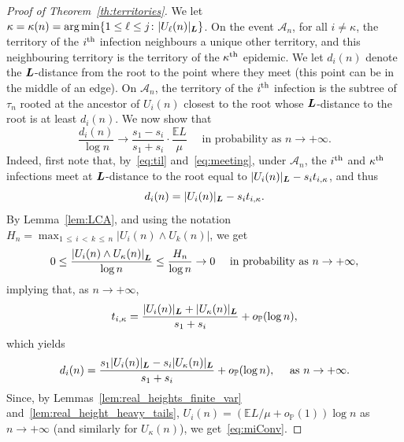 \documentclass[AHL,Unicode,longabstracts,published]{cedram}
\DeclareMathOperator*{\argmin}{arg\,min}
\newcommand{\bs}{\ensuremath{\boldsymbol}}
\newcommand{\op}{{o_{\bbP}}}
\newcommand{\bbP}{\mathbb{P}}
\newcommand{\bbE}{\mathbb{E}}
\newcommand{\clA}{\mathcal{A}}
\begin{document}
\begin{proof}[Proof of Theorem~\ref{th:territories}]
We let $\kappa = \kappa(n) = \argmin \{1\leq \ell\leq j\colon |U_\ell(n)|_{\bs L}\}$. On the event $\clA_n$, for all $i\neq \kappa$, the territory of the $i^{\rm th}$ infection neighbours a unique other territory, and this neighbouring territory is the territory of the $\kappa^{\rm th}$ epidemic. We let $d_i(n)$ denote the $\bs L$-distance from the root to the point where they meet (this point can be in the middle of an edge). On $\clA_n$, the territory of the $i^{\rm th}$ infection is the subtree of $\tau_n$ rooted at the ancestor of $U_i(n)$ closest to the root whose $\bs L$-distance to the root is at least $d_i(n)$. We now show that
\begin{equation}\label{eq:miConv}
\frac{d_i(n)}{\log n} \to
\frac{s_1-s_i}{s_1+s_i}\cdot\frac{\bbE L}{\mu}\quad\text{ in probability as }n\to+\infty.
\end{equation}
Indeed, first note that, by~\eqref{eq:til} and~\eqref{eq:meeting}, under $\clA_n$, the $i^{\rm th}$ and $\kappa^{\rm th}$ infections meet at $\bs L$-distance to the root equal to $|U_i(n)|_{\bs L} - s_i t_{i, \kappa}$, and thus
\[
d_i(n) = |U_i(n)|_{\bs L}-s_i t_{i,\kappa}.
\]
By Lemma~\ref{lem:LCA}, and using the notation $H_n=\max_{1\,\le\,i\,<\,k\,\le \,n} |U_i(n)\wedge U_k(n)|$, we get
\begin{equation}\label{eq:top_height_negl}
0\leq \frac{\left|U_i(n)\wedge U_\kappa(n)\right|_{\bs L}}{\log n}
\leq \frac{H_n}{\log n} \to 0 \quad\text{ in probability as }n\to+\infty,
\end{equation}
implying that, as $n\to+\infty$,
\begin{equation}\label{eq:approx_tcross}
t_{i, \kappa} = \frac{|U_i(n)|_{\bs L}+|U_\kappa(n)|_{\bs L}}{s_1+s_i} + \op(\log n),
\end{equation}
which yields
\[
d_i(n) = \frac{s_1|U_i(n)|_{\bs L}-s_i |U_\kappa(n)|_{\bs L}}{s_1+s_i} + \op(\log n),\quad\text{ as }n\to+\infty.
\]
Since, by Lemmas~\ref{lem:real_heights_finite_var} and~\ref{lem:real_height_heavy_tails}, $U_i(n)=(\bbE L/\mu+\op(1)) \log n$ as $n\to+\infty$ (and similarly for $U_\kappa(n)$), we get~\eqref{eq:miConv}.


\end{proof}
\end{document}
